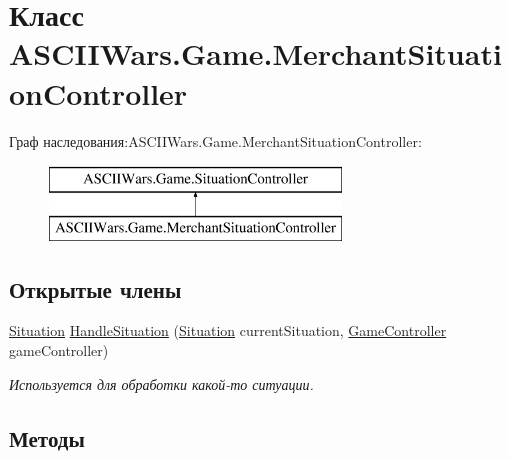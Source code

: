 \hypertarget{class_a_s_c_i_i_wars_1_1_game_1_1_merchant_situation_controller}{}\section{Класс A\+S\+C\+I\+I\+Wars.\+Game.\+Merchant\+Situation\+Controller}
\label{class_a_s_c_i_i_wars_1_1_game_1_1_merchant_situation_controller}
Граф наследования\+:A\+S\+C\+I\+I\+Wars.\+Game.\+Merchant\+Situation\+Controller\+:\begin{figure}[H]
\begin{center}
\leavevmode
\includegraphics[height=2.000000cm]{class_a_s_c_i_i_wars_1_1_game_1_1_merchant_situation_controller}
\end{center}
\end{figure}
\subsection*{Открытые члены}
\begin{DoxyCompactItemize}
\item 
\hyperlink{class_a_s_c_i_i_wars_1_1_game_1_1_situation}{Situation} \hyperlink{class_a_s_c_i_i_wars_1_1_game_1_1_merchant_situation_controller_a4048d09077a393377801bf3f3697115b}{Handle\+Situation} (\hyperlink{class_a_s_c_i_i_wars_1_1_game_1_1_situation}{Situation} current\+Situation, \hyperlink{class_a_s_c_i_i_wars_1_1_game_1_1_game_controller}{Game\+Controller} game\+Controller)
\begin{DoxyCompactList}\small\item\em Используется для обработки какой-\/то ситуации. \end{DoxyCompactList}\end{DoxyCompactItemize}


\subsection{Методы}
\hypertarget{class_a_s_c_i_i_wars_1_1_game_1_1_merchant_situation_controller_a4048d09077a393377801bf3f3697115b}{}\label{class_a_s_c_i_i_wars_1_1_game_1_1_merchant_situation_controller_a4048d09077a393377801bf3f3697115b} 
